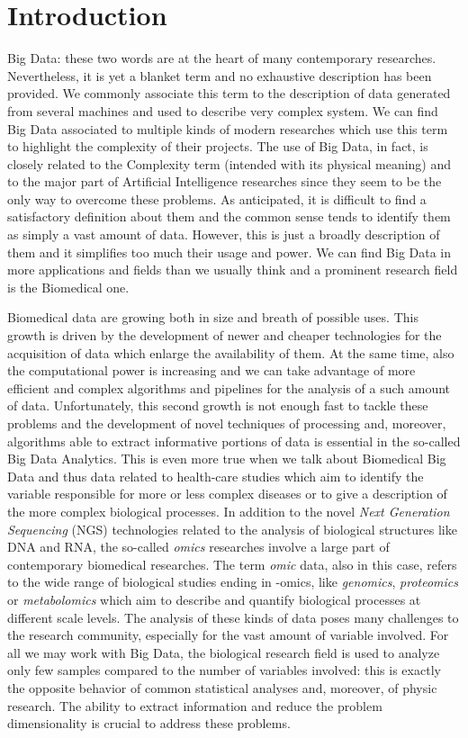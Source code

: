 \documentclass{standalone}
\begin{document}
\chapter*{Introduction}\label{Introduction}

Big Data: these two words are at the heart of many contemporary researches.
Nevertheless, it is yet a blanket term and no exhaustive description has been provided.
We commonly associate this term to the description of data generated from several machines and used to describe very complex system.
We can find Big Data associated to multiple kinds of modern researches which use this term to highlight the complexity of their projects.
The use of Big Data, in fact, is closely related to the Complexity term (intended with its physical meaning) and to the major part of Artificial Intelligence researches since they seem to be the only way to overcome these problems.
As anticipated, it is difficult to find a satisfactory definition about them and the common sense tends to identify them as simply a vast amount of data.
However, this is just a broadly description of them and it simplifies too much their usage and power.
We can find Big Data in more applications and fields than we usually think and a prominent research field is the Biomedical one.

Biomedical data are growing both in size and breath of possible uses.
This growth is driven by the development of newer and cheaper technologies for the acquisition of data which enlarge the availability of them.
At the same time, also the computational power is increasing and we can take advantage of more efficient and complex algorithms and pipelines for the analysis of a such amount of data.
Unfortunately, this second growth is not enough fast to tackle these problems and the development of novel techniques of processing and, moreover, algorithms able to extract informative portions of data is essential in the so-called Big Data Analytics.
This is even more true when we talk about Biomedical Big Data and thus data related to health-care studies which aim to identify the variable responsible for more or less complex diseases or to give a description of the more complex biological processes.
In addition to the novel \emph{Next Generation Sequencing} (NGS) technologies related to the analysis of biological structures like DNA and RNA, the so-called \emph{omics} researches involve a large part of contemporary biomedical researches.
The term \emph{omic} data, also in this case, refers to the wide range of biological studies ending in -omics, like \emph{genomics}, \emph{proteomics} or \emph{metabolomics} which aim to describe and quantify biological processes at different scale levels.
The analysis of these kinds of data poses many challenges to the research community, especially for the vast amount of variable involved.
For all we may work with Big Data, the biological research field is used to analyze only few samples compared to the number of variables involved: this is exactly the opposite behavior of common statistical analyses and, moreover, of physic research.
The ability to extract information and reduce the problem dimensionality is crucial to address these problems.
\end{document}
